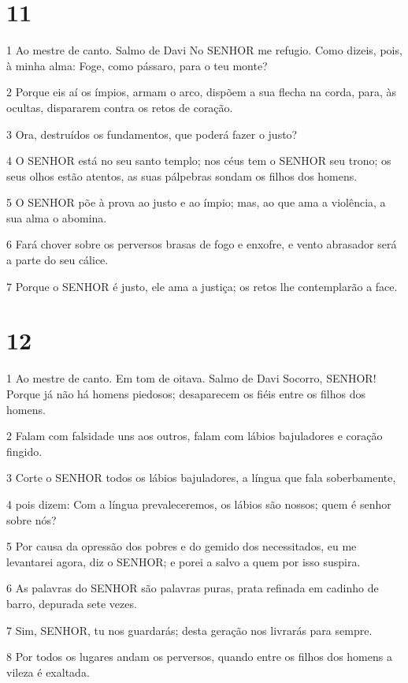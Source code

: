 \chapter{11}

\par 1 Ao mestre de canto. Salmo de Davi No SENHOR me refugio. Como dizeis, pois, à minha alma: Foge, como pássaro, para o teu monte?
\par 2 Porque eis aí os ímpios, armam o arco, dispõem a sua flecha na corda, para, às ocultas, dispararem contra os retos de coração.
\par 3 Ora, destruídos os fundamentos, que poderá fazer o justo?
\par 4 O SENHOR está no seu santo templo; nos céus tem o SENHOR seu trono; os seus olhos estão atentos, as suas pálpebras sondam os filhos dos homens.
\par 5 O SENHOR põe à prova ao justo e ao ímpio; mas, ao que ama a violência, a sua alma o abomina.
\par 6 Fará chover sobre os perversos brasas de fogo e enxofre, e vento abrasador será a parte do seu cálice.
\par 7 Porque o SENHOR é justo, ele ama a justiça; os retos lhe contemplarão a face.

\chapter{12}

\par 1 Ao mestre de canto. Em tom de oitava. Salmo de Davi Socorro, SENHOR! Porque já não há homens piedosos; desaparecem os fiéis entre os filhos dos homens.
\par 2 Falam com falsidade uns aos outros, falam com lábios bajuladores e coração fingido.
\par 3 Corte o SENHOR todos os lábios bajuladores, a língua que fala soberbamente,
\par 4 pois dizem: Com a língua prevaleceremos, os lábios são nossos; quem é senhor sobre nós?
\par 5 Por causa da opressão dos pobres e do gemido dos necessitados, eu me levantarei agora, diz o SENHOR; e porei a salvo a quem por isso suspira.
\par 6 As palavras do SENHOR são palavras puras, prata refinada em cadinho de barro, depurada sete vezes.
\par 7 Sim, SENHOR, tu nos guardarás; desta geração nos livrarás para sempre.
\par 8 Por todos os lugares andam os perversos, quando entre os filhos dos homens a vileza é exaltada.

